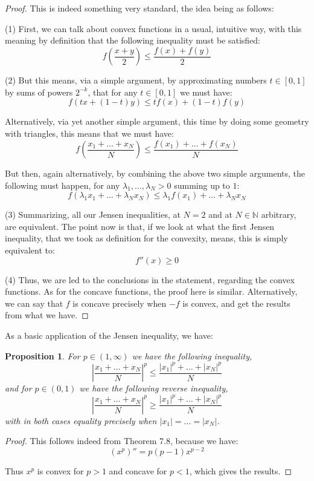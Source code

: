 \documentclass[12pt]{amsbook}
\newtheorem{proposition}[theorem]{Proposition}
\begin{document}
\begin{proof}
This is indeed something very standard, the idea being as follows:

\medskip

(1) First, we can talk about convex functions in a usual, intuitive way, with this meaning by definition that the following inequality must be satisfied:
$$f\left(\frac{x+y}{2}\right)\leq\frac{f(x)+f(y)}{2}$$

(2) But this means, via a simple argument, by approximating numbers $t\in[0,1]$ by sums of powers $2^{-k}$, that for any $t\in[0,1]$ we must have:
$$f(tx+(1-t)y)\leq tf(x)+(1-t)f(y)$$

Alternatively, via yet another simple argument, this time by doing some geometry with triangles, this means that we must have:
$$f\left(\frac{x_1+\ldots+x_N}{N}\right)\leq\frac{f(x_1)+\ldots+f(x_N)}{N}$$

But then, again alternatively, by combining the above two simple arguments, the following must happen, for any $\lambda_1,\ldots,\lambda_N>0$ summing up to $1$:
$$f(\lambda_1x_1+\ldots+\lambda_Nx_N)\leq\lambda_1f(x_1)+\ldots+\lambda_Nx_N$$

(3) Summarizing, all our Jensen inequalities, at $N=2$ and at $N\in\mathbb N$ arbitrary, are equivalent. The point now is that, if we look at what the first Jensen inequality, that we took as definition for the convexity, means, this is simply equivalent to:
$$f''(x)\geq0$$

(4) Thus, we are led to the conclusions in the statement, regarding the convex functions. As for the concave functions, the proof here is similar. Alternatively, we can say that $f$ is concave precisely when $-f$ is convex, and get the results from what we have.
\end{proof}

As a basic application of the Jensen inequality, we have:

\begin{proposition}
For $p\in(1,\infty)$ we have the following inequality,
$$\left|\frac{x_1+\ldots+x_N}{N}\right|^p\leq\frac{|x_1|^p+\ldots+|x_N|^p}{N}$$
and for $p\in(0,1)$ we have the following reverse inequality,
$$\left|\frac{x_1+\ldots+x_N}{N}\right|^p\geq\frac{|x_1|^p+\ldots+|x_N|^p}{N}$$
with in both cases equality precisely when $|x_1|=\ldots=|x_N|$.
\end{proposition}

\begin{proof}
This follows indeed from Theorem 7.8, because we have:
$$(x^p)''=p(p-1)x^{p-2}$$

Thus $x^p$ is convex for $p>1$ and concave for $p<1$, which gives the results.
\end{proof}
\end{document}
